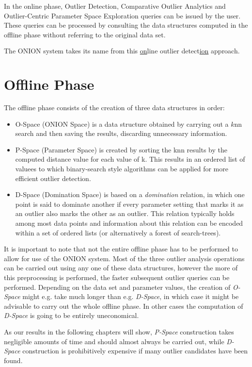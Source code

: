 \documentclass[runningheads]{llncs}
\begin{document}
In the online phase, Outlier Detection, Comparative Outlier Analytics and Outlier-Centric Parameter Space Exploration queries can be issued by the user. These queries can be processed by consulting the data structures computed in the offline phase without referring to the original data set.

The ONION system takes its name from this \underline{on}line outlier detect\underline{ion} approach.

\section{Offline Phase}

The offline phase consists of the creation of three data structures in order:

\begin{itemize}
 \item O-Space (ONION Space) is a data structure obtained by carrying out a $k$nn search and then saving the results, discarding unnecessary information.
 \item P-Space (Parameter Space) is created by sorting the knn results by the computed distance value for each value of k. This results in an ordered list of valuees to which binary-search style algorithms can be applied for more efficient outlier detection.
 \item D-Space (Domination Space) is based on a \emph{domination} relation, in which one point is said to dominate another if every parameter setting that marks it as an outlier also marks the other as an outlier. This relation typically holds among most data points and information about this relation can be encoded within a set of ordered lists (or alternatively a forest of search-trees).
\end{itemize}

It is important to note that not the entire offline phase has to be performed to allow for use of the ONION system. Most of the three outlier analysis operations can be carried out using any one of these data structures, however the more of this preprocessing is performed, the faster subsequent outlier queries can be performed. Depending on the data set and parameter values, the creation of \emph{O-Space} might e.g. take much longer than e.g. \emph{D-Space}, in which case it might be advisable to carry out the whole offline phase. In other cases the computation of \emph{D-Space} is going to be entirely uneconomical.

As our results in the following chapters will show, \emph{P-Space} construction takes negligible amounts of time and should almost always be carried out, while \emph{D-Space} construction is prohibitively expensive if many outlier candidates have been found.
\end{document}
